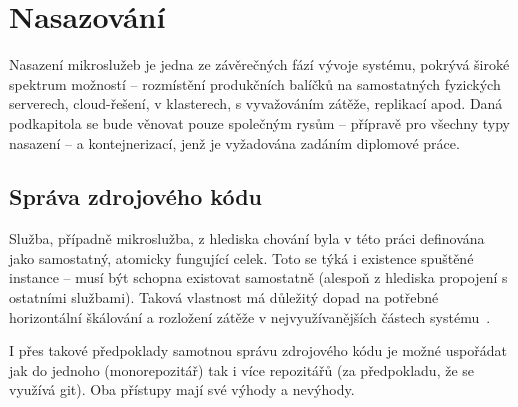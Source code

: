 \section{Nasazování}\label{sec:msa-deployment}

Nasazení mikroslužeb je jedna ze závěrečných fází vývoje systému, pokrývá široké spektrum možností – rozmístění produkčních balíčků na samostatných fyzických serverech, cloud-řešení, v klasterech, s vyvažováním zátěže, replikací apod.
Daná podkapitola se bude věnovat pouze společným rysům – přípravě pro všechny typy nasazení – a kontejnerizací, jenž je vyžadována zadáním diplomové práce.


\subsection{Správa zdrojového kódu}\label{subsec:msa-deployment-code}

Služba, případně mikroslužba, z hlediska chování byla v této práci definována jako samostatný, atomicky fungující celek.
Toto se týká i existence spuštěné instance – musí být schopna existovat samostatně (alespoň z hlediska propojení s ostatními službami).
Taková vlastnost má důležitý dopad na potřebné horizontální škálování a rozložení zátěže v nejvyužívanějších částech systému~\cite{monomulti}.

I přes takové předpoklady samotnou správu zdrojového kódu je možné uspořádat jak do jednoho (monorepozitář) tak i více repozitářů (za předpokladu, že se využívá  git).
Oba přístupy mají své výhody a nevýhody.



